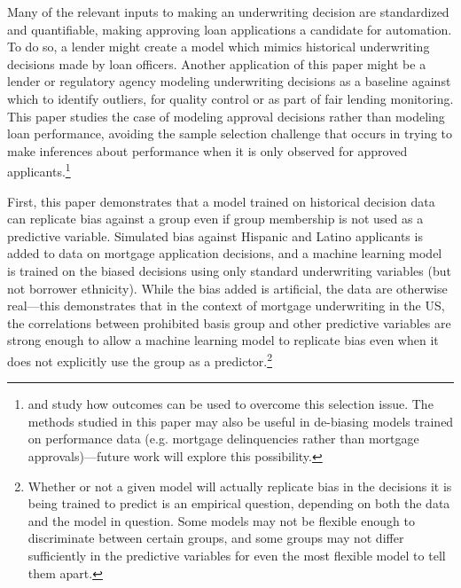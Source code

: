 Many of the relevant inputs to making an underwriting decision are standardized and quantifiable, making approving loan applications a candidate for automation. To do so, a lender might create a model which mimics historical underwriting decisions made by loan officers. Another application of this paper might be a lender or regulatory agency modeling underwriting decisions as a baseline against which to identify outliers, for quality control or as part of fair lending monitoring. This paper studies the case of modeling approval decisions rather than modeling loan performance, avoiding the sample selection challenge that occurs in trying to make inferences about performance when it is only observed for approved applicants.\footnote{ and  study how outcomes can be used to overcome this selection issue. The methods studied in this paper may also be useful in de-biasing models trained on performance data (e.g. mortgage delinquencies rather than mortgage approvals)---future work will explore this possibility.} 

First, this paper demonstrates that a model trained on historical decision data can replicate bias against a group even if group membership is not used as a predictive variable. Simulated bias against Hispanic and Latino applicants is added to data on mortgage application decisions, and a machine learning model is trained on the biased decisions using only standard underwriting variables (but not borrower ethnicity). While the bias added is artificial, the data are otherwise real---this demonstrates that in the context of mortgage underwriting in the US, the correlations between prohibited basis group and other predictive variables are strong enough to allow a machine learning model to replicate bias even when it does not explicitly use the group as a predictor.\footnote{Whether or not a given model will actually replicate bias in the decisions it is being trained to predict is an empirical question, depending on both the data and the model in question. Some models may not be flexible enough to discriminate between certain groups, and some groups may not differ sufficiently in the predictive variables for even the most flexible model to tell them apart.} 


